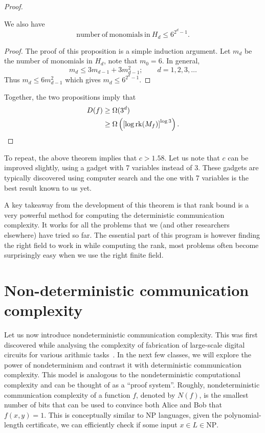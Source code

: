 \documentclass[usletter]{article}
\providecommand\rbrac[1]{\ensuremath \left(#1\right)}
\providecommand\sqbrac[1]{\ensuremath \left[#1\right]}
\newcommand{\rk}{\mathrm{rk}}
\newcommand{\mf}{M_f}
\newcommand{\df}{D(f)}
\newcommand{\nf}{N(f)}
\begin{document}
\begin{proof}
\begin{proposition}
We also have 
$$
\mathrm{number\ of\ monomials\ in}\ H_d \leq 6^{2^d -1}.
$$
\end{proposition}
\begin{proof}
The proof of this proposition is a simple induction argument. Let $m_d$ be the number of monomials in $H_d$, note that $m_0 = 6$. In general,
$$
m_d \leq 3 m_{d-1} + 3 m_{d-1}^2; \qquad d = 1, 2, 3, \ldots
$$
Thus $m_d \leq 6 m_{d-1}^2$ which gives $m_d \leq 6^{2^d - 1}$.
\end{proof}

Together, the two propositions imply that
\begin{align*}
\df &\geq \Omega(3^d)\\
& \geq \Omega \rbrac{\sqbrac{\log \rk (\mf)}^{\log 3} }.
\end{align*}
\end{proof}

\begin{remark}
To repeat, the above theorem implies that $c > 1.58$. Let us note that $c$ can be improved slightly, using a gadget with 7 variables instead of 3. These gadgets are typically discovered using computer search and the one with 7 variables is the best result known to us yet.

A key takeaway from the development of this theorem is that rank bound is a very powerful method for computing the deterministic communication complexity. It works for all the problems that we (and other researchers elsewhere) have tried so far. The essential part of this program is however finding the right field to work in while computing the rank, most problems often become surprisingly easy when we use the right finite field.
\end{remark}


\section{Non-deterministic communication complexity}

Let us now introduce nondeterministic communication complexity. This was first discovered while analysing the complexity of fabrication of large-scale digital circuits for various arithmic tasks~\cite{lipton1981lower}. In the next few classes, we will explore the power of nondeterminism and contrast it with deterministic communication complexity. This model is analogous to the nondeterministic computational complexity and can be thought of as a ``proof system''. Roughly, nondeterministic communication complexity of a function $f$, denoted by $\nf$, is the smallest number of bits that can be used to convince both Alice and Bob that $f(x,y) = 1$. This is conceptually similar to $\mathrm{NP}$ languages, given the polynomial-length certificate, we can efficiently check if some input $x \in L \in \mathrm{NP}$.
\end{document}
